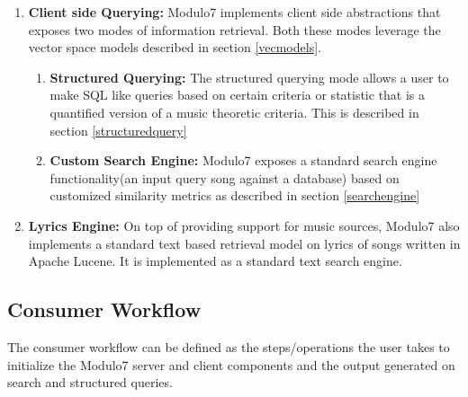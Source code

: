 \documentclass{article}
\begin{document}
\begin{enumerate}
\item \textbf{Client side Querying: } Modulo7 implements client side abstractions that exposes two modes of information retrieval. Both these modes leverage the vector space models described in section \ref{vecmodels}.
\begin{enumerate}
\item \textbf{Structured Querying: } The structured querying mode allows a user to make SQL like queries based on certain criteria or statistic that is a quantified version of a music theoretic criteria. This is described in section \ref{structuredquery}
\item \textbf{Custom Search Engine: } Modulo7 exposes a standard search engine functionality(an input query song against a database) based on  customized similarity metrics as described in section \ref{searchengine} 
\end{enumerate}

\item \textbf{Lyrics Engine: } On top of providing support for music sources, Modulo7 also implements a standard text based retrieval model on lyrics of songs written in Apache Lucene. It is implemented as a standard text search engine.

\end{enumerate}

\subsection{Consumer Workflow} 

The consumer workflow can be defined as the steps/operations the user takes to initialize the Modulo7 server and client components and the output generated on search and structured queries. 
\end{document}
